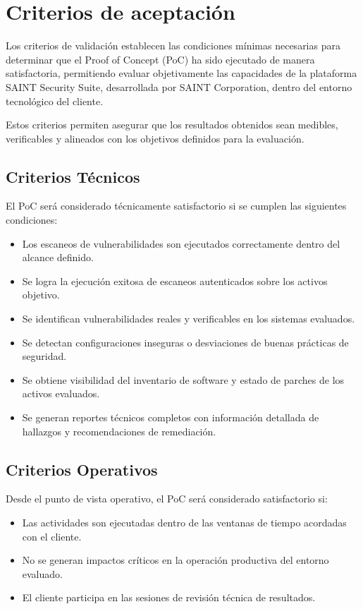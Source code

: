 \documentclass[a4paper]{article}
\begin{document}
    \section{Criterios de aceptación}
    Los criterios de validación establecen las condiciones mínimas necesarias para determinar que el Proof of Concept (PoC) ha sido ejecutado de manera satisfactoria, permitiendo evaluar objetivamente las capacidades de la plataforma SAINT Security Suite, desarrollada por SAINT Corporation, dentro del entorno tecnológico del cliente.

    Estos criterios permiten asegurar que los resultados obtenidos sean medibles, verificables y alineados con los objetivos definidos para la evaluación.
    \subsection{Criterios Técnicos}
    El PoC será considerado técnicamente satisfactorio si se cumplen las siguientes condiciones:

    \begin{itemize}
        \item Los escaneos de vulnerabilidades son ejecutados correctamente dentro del alcance definido.
        \item Se logra la ejecución exitosa de escaneos autenticados sobre los activos objetivo.
        \item Se identifican vulnerabilidades reales y verificables en los sistemas evaluados.
        \item Se detectan configuraciones inseguras o desviaciones de buenas prácticas de seguridad.
        \item Se obtiene visibilidad del inventario de software y estado de parches de los activos evaluados.
        \item Se generan reportes técnicos completos con información detallada de hallazgos y recomendaciones de remediación.
    \end{itemize}

    \subsection{Criterios Operativos}
    Desde el punto de vista operativo, el PoC será considerado satisfactorio si:

    \begin{itemize}
        \item Las actividades son ejecutadas dentro de las ventanas de tiempo acordadas con el cliente.
        \item No se generan impactos críticos en la operación productiva del entorno evaluado.
        \item El cliente participa en las sesiones de revisión técnica de resultados.
    \end{itemize}
\end{document}
